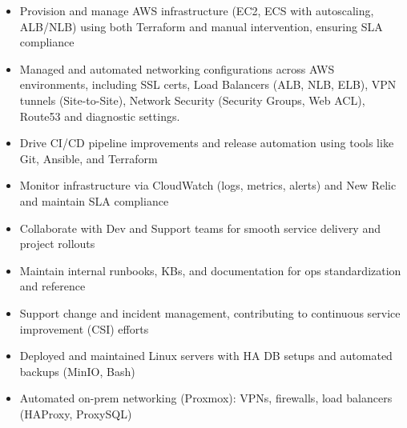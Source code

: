 \documentclass[10pt,a4paper,ragged2e,withhyper]{altacv}
\begin{document}


\makecvheader


\begin{paracol}{2}



\begin{itemize}
\item Provision and manage AWS infrastructure (EC2, ECS with autoscaling, ALB/NLB) using both Terraform and manual intervention, ensuring SLA compliance
\item Managed and automated networking configurations across AWS environments, including SSL certs, Load Balancers (ALB, NLB, ELB), VPN tunnels (Site-to-Site), Network Security (Security Groups, Web ACL), Route53 and diagnostic settings.
\item Drive CI/CD pipeline improvements and release automation using tools like Git, Ansible, and Terraform
\item Monitor infrastructure via CloudWatch (logs, metrics, alerts) and New Relic and maintain SLA compliance
\item Collaborate with Dev and Support teams for smooth service delivery and project rollouts
\item Maintain internal runbooks, KBs, and documentation for ops standardization and reference
\item Support change and incident management, contributing to continuous service improvement (CSI) efforts
\end{itemize}

\divider

\begin{itemize}
\item Deployed and maintained Linux servers with HA DB setups and automated backups (MinIO, Bash)

\item Automated on-prem networking (Proxmox): VPNs, firewalls, load balancers (HAProxy, ProxySQL)


\end{itemize}
\end{paracol}
\end{document}
